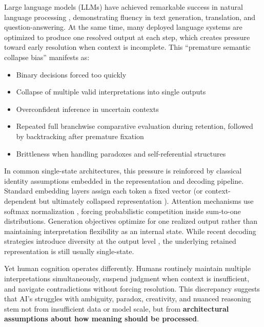 \documentclass[11pt,a4paper]{article}
\begin{document}
Large language models (LLMs) have achieved remarkable success in natural language processing \cite{devlin2019bert, radford2018improving}, demonstrating fluency in text generation, translation, and question-answering.
At the same time, many deployed language systems are optimized to produce one resolved output at each step, which creates pressure toward early resolution when context is incomplete.
This ``premature semantic collapse bias'' manifests as:

\begin{itemize}
\item Binary decisions forced too quickly
\item Collapse of multiple valid interpretations into single outputs
\item Overconfident inference in uncertain contexts
\item Repeated full branchwise comparative evaluation during retention, followed by backtracking after premature fixation
\item Brittleness when handling paradoxes and self-referential structures
\end{itemize}

In common single-state architectures, this pressure is reinforced by classical identity assumptions embedded in the representation and decoding pipeline.
Standard embedding layers assign each token a fixed vector (or context-dependent but ultimately collapsed representation \cite{peters2018deep}).
Attention mechanisms use softmax normalization \cite{vaswani2017attention}, forcing probabilistic competition inside sum-to-one distributions.
Generation objectives optimize for one realized output rather than maintaining interpretation flexibility as an internal state.
While recent decoding strategies introduce diversity at the output level \cite{holtzman2020curious, li2023contrastive}, the underlying retained representation is still usually single-state.

Yet human cognition operates differently.
Humans routinely maintain multiple interpretations simultaneously, suspend judgment when context is insufficient, and navigate contradictions without forcing resolution.
This discrepancy suggests that AI's struggles with ambiguity, paradox, creativity, and nuanced reasoning stem not from insufficient data or model scale, but from \textbf{architectural assumptions about how meaning should be processed}.
\end{document}
